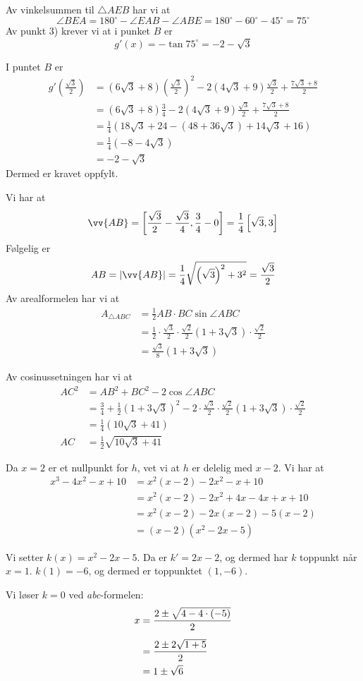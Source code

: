 {Av vinkelsummen til $\triangle AEB$ har vi at 
\[ \angle BEA=180^\circ-\angle EAB-\angle ABE=180^\circ-60^\circ-45^\circ=75^\circ \]
Av punkt 3) krever vi at i punket $B$ er
\[ g'(x)=-\tan 75^\circ =-2-\sqrt{3} \]

I puntet $B$ er
\begin{align*}
	g'\left(\frac{\sqrt{3}}{2}\right)&=(6\sqrt{3} + 8)\left(\frac{\sqrt{3}}{2}\right)^2 - 2(4\sqrt{3}+9)\frac{\sqrt{3}}{2} + \frac{7\sqrt{3} + 8}{2} \\
	&=(6\sqrt{3}+8)\frac{3}{4}- 2(4\sqrt{3}+9)\frac{\sqrt{3}}{2} + \frac{7\sqrt{3} + 8}{2} \\
	&=\frac{1}{4}\left(18\sqrt{3}+24-(48+36\sqrt{3})+14\sqrt{3}+16\right)\\
	&=\frac{1}{4}(-8-4\sqrt{3}) \\
	&=-2-\sqrt{3}
\end{align*}
Dermed er kravet oppfylt.
\item Vi har at 
\[ \vv{AB}=\left[\frac{\sqrt{3}}{2}-\frac{\sqrt{3}}{4}, \frac{3}{4}-0\right]=\frac{1}{4}\left[\sqrt{3}, 3\right] \]
Følgelig er 
\[ AB=|\vv{AB}|=\frac{1}{4}\sqrt{\left(\sqrt{3}\right)^2+3^2}=\frac{\sqrt{3}}{2} \]
Av arealformelen har vi at
\begin{align*}
	A_{\triangle ABC}&= \frac{1}{2}AB\cdot BC \sin \angle ABC \\
	&=\frac{1}{2}\cdot\frac{\sqrt{3}}{2}\cdot\frac{\sqrt{2}}{2}\left(1+3\sqrt{3}\right)\cdot\frac{\sqrt{2}}{2} \\
	&=\frac{\sqrt{3}}{8}\left(1+3\sqrt{3}\right)
\end{align*}
\item Av cosinussetningen har vi at
\begin{align*}
	AC^2&=AB^2+BC^2-2\cos \angle ABC \\
	&=\frac{3}{4}+\frac{1}{2}\left(1+3\sqrt{3}\right)^2-2\cdot\frac{\sqrt{3}}{2}\cdot\frac{\sqrt{2}}{2}\left(1+3\sqrt{3}\right)\cdot\frac{\sqrt{2}}{2} \\
	&=\frac{1}{4}\left(10\sqrt{3}+41\right) \\
	AC &= \frac{1}{2}\sqrt{10\sqrt{3}+41}
\end{align*}
\item Da $x=2$ er et nullpunkt for $h$, vet vi at $h$ er delelig med $x-2$. Vi har at
\begin{align*}
	x^3-4x^2-x+10&=x^2(x-2)-2x^2-x+10 \\
	&=x^2(x-2)-2x^2+4x-4x+x+10\\
	&=x^2(x-2)-2x(x-2)-5(x-2) \\
	&=(x-2)(x^2-2x-5)
\end{align*}
\item Vi setter $k(x)=x^2-2x-5$. Da er $k'=2x-2$, og dermed har $k$ toppunkt når $x=1$. $k(1)=-6$, og dermed er toppunktet $(1, -6)$.
\item Vi løser $k=0$ ved \textit{abc}-formelen:
\begin{align*}
	x &= \frac{2\pm\sqrt{4-4\cdot(-5)}}{2}\br
	&= \frac{2\pm2\sqrt{1+5}}{2} \\
	&= 1\pm\sqrt{6}
\end{align*}

}
\newpage


